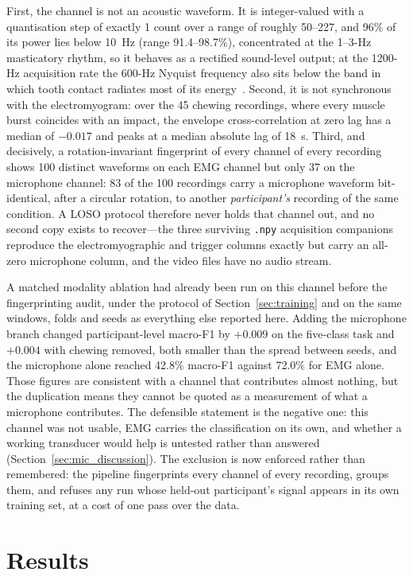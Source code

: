 \documentclass[pdflatex,sn-nature,iicol]{sn-jnl}
\begin{document}
First, the channel is not an acoustic waveform. It is integer-valued with a quantisation step of exactly 1 count over a range of roughly 50--227, and 96\% of its power lies below 10~Hz (range 91.4--98.7\%), concentrated at the 1--3-Hz masticatory rhythm, so it behaves as a rectified sound-level output; at the 1200-Hz acquisition rate the 600-Hz Nyquist frequency also sits below the band in which tooth contact radiates most of its energy~\cite{romano2024wearable}. Second, it is not synchronous with the electromyogram: over the 45 chewing recordings, where every muscle burst coincides with an impact, the envelope cross-correlation at zero lag has a median of $-0.017$ and peaks at a median absolute lag of 18~s. Third, and decisively, a rotation-invariant fingerprint of every channel of every recording shows 100 distinct waveforms on each EMG channel but only 37 on the microphone channel: 83 of the 100 recordings carry a microphone waveform bit-identical, after a circular rotation, to another \emph{participant's} recording of the same condition. A LOSO protocol therefore never holds that channel out, and no second copy exists to recover---the three surviving \texttt{.npy} acquisition companions reproduce the electromyographic and trigger columns exactly but carry an all-zero microphone column, and the video files have no audio stream.

A matched modality ablation had already been run on this channel before the fingerprinting audit, under the protocol of Section~\ref{sec:training} and on the same windows, folds and seeds as everything else reported here. Adding the microphone branch changed participant-level macro-F1 by $+0.009$ on the five-class task and $+0.004$ with chewing removed, both smaller than the spread between seeds, and the microphone alone reached 42.8\% macro-F1 against 72.0\% for EMG alone. Those figures are consistent with a channel that contributes almost nothing, but the duplication means they cannot be quoted as a measurement of what a microphone contributes. The defensible statement is the negative one: this channel was not usable, EMG carries the classification on its own, and whether a working transducer would help is untested rather than answered (Section~\ref{sec:mic_discussion}). The exclusion is now enforced rather than remembered: the pipeline fingerprints every channel of every recording, groups them, and refuses any run whose held-out participant's signal appears in its own training set, at a cost of one pass over the data.

\section{Results}
\end{document}
